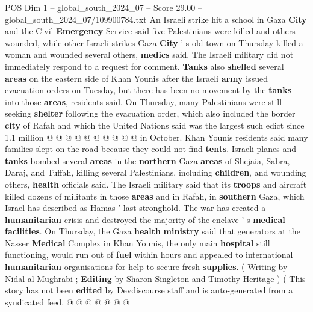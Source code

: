 \begin{textsample}{POS Dim 1 – global\_south\_2024\_07 – Score 29.00 – global\_south\_2024\_07/109900784.txt}
An Israeli strike hit a school in Gaza \textbf{City} and the Civil \textbf{Emergency} Service said five Palestinians were killed and others wounded, while other Israeli strikes Gaza \textbf{City} ' s old town on Thursday killed a woman and wounded several others, \textbf{medics} said.
The Israeli military did not immediately respond to a request for comment. \textbf{Tanks} also \textbf{shelled} several \textbf{areas} on the eastern side of Khan Younis after the Israeli \textbf{army} issued evacuation orders on Tuesday, but there has been no movement by the \textbf{tanks} into those \textbf{areas}, residents said.
On Thursday, many Palestinians were still seeking \textbf{shelter} following the evacuation order, which also included the border \textbf{city} of Rafah and which the United Nations said was the largest such edict since 1.1 million @ @ @ @ @ @ @ @ @ @ in October.
Khan Younis residents said many families slept on the road because they could not find \textbf{tents}.
Israeli planes and \textbf{tanks} bombed several \textbf{areas} in the \textbf{northern} Gaza \textbf{areas} of Shejaia, Sabra, Daraj, and Tuffah, killing several Palestinians, including \textbf{children}, and wounding others, \textbf{health} officials said.
The Israeli military said that its \textbf{troops} and aircraft killed dozens of militants in those \textbf{areas} and in Rafah, in \textbf{southern} Gaza, which Israel has described as Hamas ' last stronghold.
The war has created a \textbf{humanitarian} crisis and destroyed the majority of the enclave ' s \textbf{medical} \textbf{facilities}.
On Thursday, the Gaza \textbf{health} \textbf{ministry} said that generators at the Nasser \textbf{Medical} Complex in Khan Younis, the only main \textbf{hospital} still functioning, would run out of \textbf{fuel} within hours and appealed to international \textbf{humanitarian} organisations for help to secure fresh \textbf{supplies}. ( Writing by Nidal al-Mughrabi ; \textbf{Editing} by Sharon Singleton and Timothy Heritage ) ( This story has not been \textbf{edited} by Devdiscourse staff and is auto-generated from a syndicated feed. @ @ @ @ @ @ @

\end{textsample}

